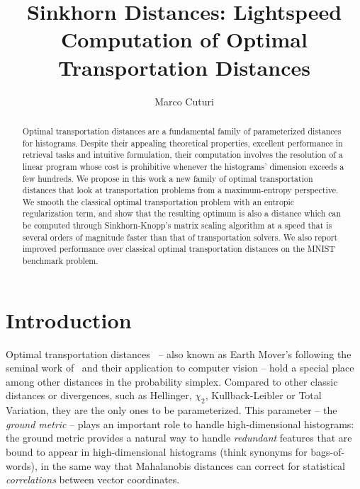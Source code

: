 \documentclass{amsart} %
\title[Sinkhorn Distances]{Sinkhorn Distances: Lightspeed Computation of Optimal Transportation Distances}
\author{Marco Cuturi}
\begin{document}
\maketitle

\begin{abstract}
Optimal transportation distances are a fundamental family of parameterized distances for histograms. Despite their appealing theoretical properties, excellent performance in retrieval tasks and intuitive formulation, their computation involves the resolution of a linear program whose cost is prohibitive whenever the histograms' dimension exceeds a few hundreds. We propose in this work a new family of optimal transportation distances that look at transportation problems from a maximum-entropy perspective. We smooth the classical optimal transportation problem with an entropic regularization term, and show that the resulting optimum is also a distance which can be computed through Sinkhorn-Knopp's matrix scaling algorithm at a speed that is several orders of magnitude faster than that of transportation solvers. We also report improved performance over classical optimal transportation distances on the MNIST benchmark problem.
\end{abstract}

\section{Introduction}
Optimal transportation distances~\citep[\S6]{villani09} -- also known as Earth Mover's following the seminal work of~\citet{rubner1997earth} and their application to computer vision -- hold a special place among other distances in the probability simplex. Compared to other classic distances or divergences, such as Hellinger, $\chi_2$, Kullback-Leibler or Total Variation, they are the only ones to be parameterized. This parameter -- the \emph{ground metric} -- plays an important role to handle high-dimensional histograms: the ground metric provides a natural way to handle \emph{redundant} features that are bound to appear in high-dimensional histograms (think synonyms for bags-of-words), in the same way that Mahalanobis distances can correct for statistical \emph{correlations} between vector coordinates.
\end{document}
